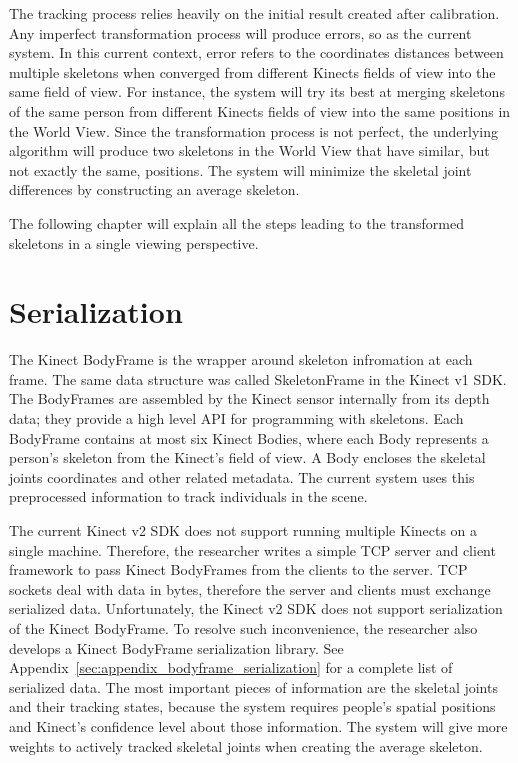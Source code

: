 The tracking process relies heavily on the initial result created after calibration. Any imperfect transformation process will produce errors, so as the current system. In this current context, error refers to the coordinates distances between multiple skeletons when converged from different Kinects fields of view into the same field of view. For instance, the system will try its best at merging skeletons of the same person from different Kinects fields of view into the same positions in the World View. Since the transformation process is not perfect, the underlying algorithm will produce two skeletons in the World View that have similar, but not exactly the same, positions. The system will minimize the skeletal joint differences by constructing an average skeleton.

The following chapter will explain all the steps leading to the transformed skeletons in a single viewing perspective.

\section{Serialization}
\label{sec:current_approach_serialization}

The Kinect BodyFrame is the wrapper around skeleton infromation at each frame. The same data structure was called SkeletonFrame in the Kinect v1 SDK. The BodyFrames are assembled by the Kinect sensor internally from its depth data; they provide a high level API for programming with skeletons. Each BodyFrame contains at most six Kinect Bodies, where each Body represents a person's skeleton from the Kinect's field of view. A Body encloses the skeletal joints coordinates and other related metadata. The current system uses this preprocessed information to track individuals in the scene.

The current Kinect v2 SDK does not support running multiple Kinects on a single machine. Therefore, the researcher writes a simple TCP server and client framework to pass Kinect BodyFrames from the clients to the server. TCP sockets deal with data in bytes, therefore the server and clients must exchange serialized data. Unfortunately, the Kinect v2 SDK does not support serialization of the Kinect BodyFrame. To resolve such inconvenience, the researcher also develops a Kinect BodyFrame serialization library. See Appendix~\ref{sec:appendix_bodyframe_serialization} for a complete list of serialized data. The most important pieces of information are the skeletal joints and their tracking states, because the system requires people's spatial positions and Kinect's confidence level about those information. The system will give more weights to actively tracked skeletal joints when creating the average skeleton.


